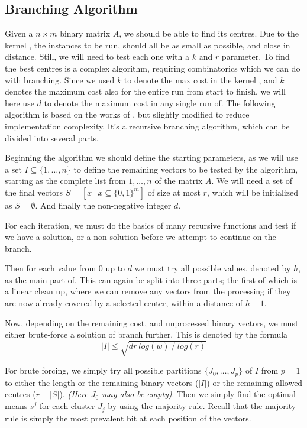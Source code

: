 \documentclass[a4paper]{article}
\begin{document}
\subsection{Branching Algorithm}
Given a $n \times m$ binary matrix $A$, we should be able to find its centres. Due to the kernel , the instances to be run, should all be as small as possible, and
close in distance. Still, we will need to test each one with a $k$ and $r$ parameter. To find the best centres is a complex algorithm, requiring combinatorics which
we can do with branching. Since we used $k$ to denote the max cost in the kernel , and $k$ denotes the 
maximum cost also for the entire run from start to finish, we will here use $d$ to denote the maximum cost in 
any single run of. The following algorithm is based on the works of \cite{fomin_golovach_panolan_2020}, but slightly modified to reduce implementation complexity. It's a recursive 
branching algorithm, which can be divided into several parts.

Beginning the algorithm we should define the starting parameters, as we will use a set 
$I \subseteq \{1, \dots ,n\}$ to define the remaining vectors to be tested by the algorithm, starting as the complete list
from $1, \dots ,n$ of the matrix $A$. We will need a set of the final vectors $S = \left[ x ~| ~x \subseteq \{0,1\}^m \right]$
of size at most $r$, which will be initialized as $S = \emptyset$. And finally the non-negative integer $d$.

For each iteration, we must do the basics of many recursive functions and test if we have a 
solution, or a non solution before we attempt to continue on the branch.

Then for each value from $0$ up to $d$ we must try all possible values, denoted by $h$, as the main part 
of. This can again be split into three parts; the first of which is a linear clean up, where 
we can remove any vectors from the processing if they are now already covered by a selected center, within
a distance of $h-1$.

Now, depending on the remaining cost, and unprocessed binary vectors, we must either brute-force a solution
of branch further. This is denoted by the formula
\[
    |I| \leq \sqrt{d r ~log(w) ~/ ~log(r)}    
\]

For brute forcing, we simply try all possible partitions $\{J_0, \dots ,J_p\}$ of $I$ from $p=1$ to either
the length or the remaining binary vectors ($|I|$) or the remaining allowed centres ($r-|S|$). \textit{(Here $J_0$ may
also be empty)}. Then we simply find the optimal means $s^j$ for each cluster $J_j$ by using the majority rule. Recall that 
the majority rule is simply the most prevalent bit at each position of the vectors.
\end{document}
